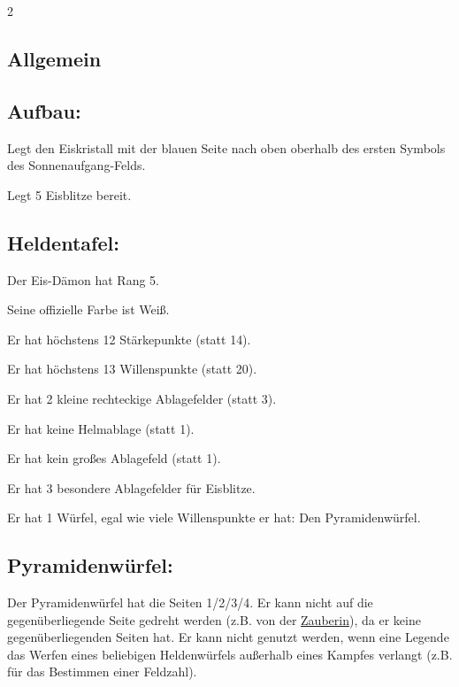 \documentclass[10pt, a4paper, oneside]{book}
\begin{document}
\begin{multicols*}{2}\raggedcolumns


\begin{nobgcolor}

\section{Allgemein}



\subsection{Aufbau:} 

Legt den Eiskristall mit der blauen Seite nach oben oberhalb des ersten Symbols des Sonnenaufgang-Felds.
\supercite{mh-kaelte,mh-begleitheft}

Legt 5 Eisblitze bereit.





\subsection{Heldentafel:}

Der Eis-Dämon hat Rang 5.

Seine offizielle Farbe ist Weiß.

Er hat höchstens 12 Stärkepunkte (statt 14).

Er hat höchstens 13 Willenspunkte (statt 20).

Er hat 2 kleine rechteckige Ablagefelder (statt 3).

Er hat keine Helmablage (statt 1).

Er hat kein großes Ablagefeld (statt 1).

Er hat 3 besondere Ablagefelder für Eisblitze.

Er hat 1 Würfel, egal wie viele Willenspunkte er hat: Den Pyramidenwürfel. 





\subsection{Pyramidenwürfel:}

Der Pyramidenwürfel hat die Seiten 1/2/3/4. Er kann nicht auf die gegenüberliegende Seite gedreht werden (z.B. von der \hyperref[zauberin]{Zauberin}), da er keine gegenüberliegenden Seiten hat.
\supercite{91842}
Er kann nicht genutzt werden, wenn eine Legende das Werfen eines beliebigen Heldenwürfels außerhalb eines Kampfes verlangt (z.B. für das Bestimmen einer Feldzahl).
\supercite{88552}





\end{nobgcolor}
\end{multicols*}
\end{document}
